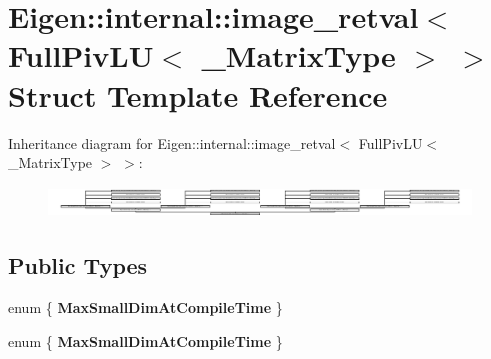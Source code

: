 \hypertarget{struct_eigen_1_1internal_1_1image__retval_3_01_full_piv_l_u_3_01___matrix_type_01_4_01_4}{}\section{Eigen\+:\+:internal\+:\+:image\+\_\+retval$<$ Full\+Piv\+LU$<$ \+\_\+\+Matrix\+Type $>$ $>$ Struct Template Reference}
\label{struct_eigen_1_1internal_1_1image__retval_3_01_full_piv_l_u_3_01___matrix_type_01_4_01_4}
Inheritance diagram for Eigen\+:\+:internal\+:\+:image\+\_\+retval$<$ Full\+Piv\+LU$<$ \+\_\+\+Matrix\+Type $>$ $>$\+:\begin{figure}[H]
\begin{center}
\leavevmode
\includegraphics[height=0.813953cm]{struct_eigen_1_1internal_1_1image__retval_3_01_full_piv_l_u_3_01___matrix_type_01_4_01_4}
\end{center}
\end{figure}
\subsection*{Public Types}
\begin{DoxyCompactItemize}
\item 
\mbox{\label{struct_eigen_1_1internal_1_1image__retval_3_01_full_piv_l_u_3_01___matrix_type_01_4_01_4_a1dcb3925194baabab0f9002f1b27a093}} 
enum \{ {\bfseries Max\+Small\+Dim\+At\+Compile\+Time}
 \}
\item 
\mbox{\label{struct_eigen_1_1internal_1_1image__retval_3_01_full_piv_l_u_3_01___matrix_type_01_4_01_4_ac9d3322153912f109525e650505db810}} 
enum \{ {\bfseries Max\+Small\+Dim\+At\+Compile\+Time}
 \}
\end{DoxyCompactItemize}
